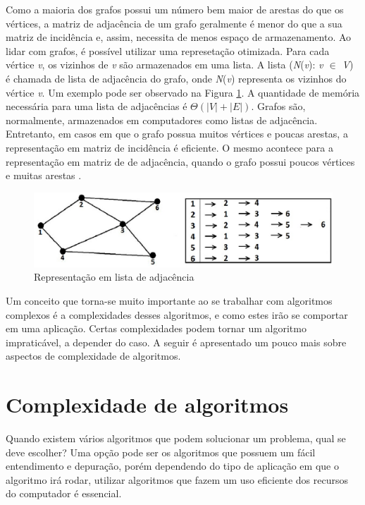 Como a maioria dos grafos possui um número bem maior de arestas do que os vértices, a matriz de adjacência de um grafo geralmente é menor do que a sua matriz de incidência e, assim, necessita de menos espaço de armazenamento. Ao lidar com grafos, é possível utilizar uma represetação otimizada. Para cada vértice \textit{v}, os vizinhos de \textit{v} são armazenados em uma lista. A lista (\textit{N}(\textit{v}): \textit{v $\in$ V}) é chamada de lista de adjacência do grafo, onde \textit{N}(\textit{v}) representa os vizinhos do vértice \textit{v}. Um exemplo pode ser observado na Figura \ref{lista_adjacencia}. A quantidade de memória necessária para uma lista de adjacências é $\Theta(|\textit{V}| + |\textit{E}|)$. Grafos são, normalmente, armazenados em computadores como listas de adjacência. Entretanto, em casos em que o grafo possua muitos vértices e poucas arestas, a representação em matriz de incidência é eficiente. O mesmo acontece para a representação em matriz de de adjacência, quando o grafo possui poucos vértices e muitas arestas \cite{Costa:2011}.

\begin{figure}[!h]
	\centering
	\includegraphics[scale=0.3]{figuras/referencial_teorico/lista_adjacencia.eps}
	\caption[Representação em lista de adjacência]{Representação em lista de adjacência \cite{Costa:2011}}
	\label{lista_adjacencia}
\end{figure}

Um conceito que torna-se muito importante ao se trabalhar com algoritmos complexos é a complexidades desses algoritmos, e como estes irão se comportar em uma aplicação. Certas complexidades podem tornar um algoritmo impraticável, a depender do caso. A seguir é apresentado um pouco mais sobre aspectos de complexidade de algoritmos.

\section{Complexidade de algoritmos}
\label{sec:complexidade_algoritmos}

Quando existem vários algoritmos que podem solucionar um problema, qual se deve escolher? Uma opção pode ser os algoritmos que possuem um fácil entendimento e depuração, porém dependendo do tipo de aplicação em que o algoritmo irá rodar, utilizar algoritmos que fazem um uso eficiente dos recursos do computador é essencial.

